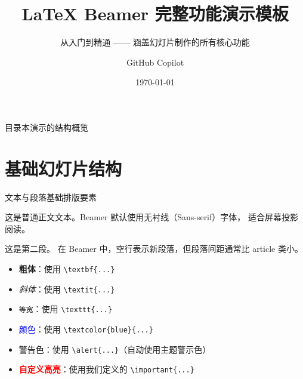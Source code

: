\documentclass[UTF8,11pt,aspectratio=169]{beamer}
\title[Beamer 模板教学]{LaTeX Beamer 完整功能演示模板}
\subtitle{从入门到精通 —— 涵盖幻灯片制作的所有核心功能}
\author[GitHub Copilot]{GitHub Copilot}
\date{\today}                                %
\institute{数字IC 设计}                      %
\newcommand{\important}[1]{\textcolor{red}{\textbf{#1}}}
\begin{document}
\begin{frame}
    \titlepage
\end{frame}

\begin{frame}{目录}{本演示的结构概览}
    \tableofcontents
\end{frame}

\section{基础幻灯片结构}

\begin{frame}[fragile]{文本与段落}{基础排版要素}

    这是普通正文文本。Beamer 默认使用无衬线（Sans-serif）字体，
    适合屏幕投影阅读。

    这是第二段。
    在 Beamer 中，空行表示新段落，但段落间距通常比 article 类小。

    \begin{itemize}
        \item \textbf{粗体}：使用 \verb|\textbf{...}|
        \item \textit{斜体}：使用 \verb|\textit{...}|
        \item \texttt{等宽}：使用 \verb|\texttt{...}|
        \item \textcolor{blue}{颜色}：使用 \verb|\textcolor{blue}{...}|
        \item \alert{警告色}：使用 \verb|\alert{...}|（自动使用主题警示色）
        \item \important{自定义高亮}：使用我们定义的 \verb|\important{...}|
    \end{itemize}
\end{frame}
\end{document}
